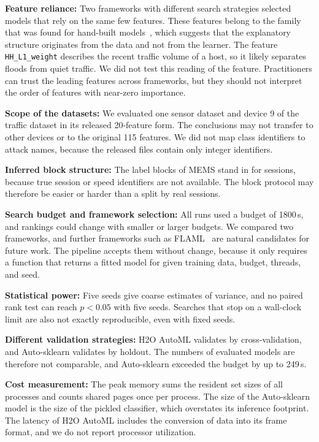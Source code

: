 \textbf{Feature reliance:} Two frameworks with different search strategies selected models that rely on the same few features. These features belong to the family that was found for hand-built models~\cite{gummadi2024xaiiot}, which suggests that the explanatory structure originates from the data and not from the learner. The feature \texttt{HH\_L1\_weight} describes the recent traffic volume of a host, so it likely separates floods from quiet traffic. We did not test this reading of the feature. Practitioners can trust the leading features across frameworks, but they should not interpret the order of features with near-zero importance.

\textbf{Scope of the datasets:} We evaluated one sensor dataset and device 9 of the traffic dataset in its released 20-feature form. The conclusions may not transfer to other devices or to the original 115 features. We did not map class identifiers to attack names, because the released files contain only integer identifiers.

\textbf{Inferred block structure:} The label blocks of MEMS stand in for sessions, because true session or speed identifiers are not available. The block protocol may therefore be easier or harder than a split by real sessions.

\textbf{Search budget and framework selection:} All runs used a budget of 1800\,s, and rankings could change with smaller or larger budgets. We compared two frameworks, and further frameworks such as FLAML~\cite{wang2019flaml} are natural candidates for future work. The pipeline accepts them without change, because it only requires a function that returns a fitted model for given training data, budget, threads, and seed.

\textbf{Statistical power:} Five seeds give coarse estimates of variance, and no paired rank test can reach $p<0.05$ with five seeds. Searches that stop on a wall-clock limit are also not exactly reproducible, even with fixed seeds.

\textbf{Different validation strategies:} H2O AutoML validates by cross-validation, and Auto-sklearn validates by holdout. The numbers of evaluated models are therefore not comparable, and Auto-sklearn exceeded the budget by up to 249\,s.

\textbf{Cost measurement:} The peak memory sums the resident set sizes of all processes and counts shared pages once per process. The size of the Auto-sklearn model is the size of the pickled classifier, which overstates its inference footprint. The latency of H2O AutoML includes the conversion of data into its frame format, and we do not report processor utilization.


